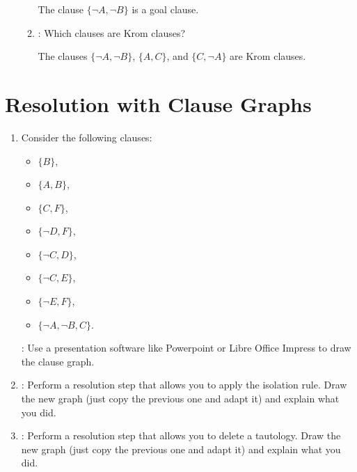 \documentclass[solution]{acAssignment}
\begin{document}
\begin{enumerate}
\begin{enumerate}
                \begin{acSolution}
                    The clause $\{\lnot A, \lnot B\}$ is a goal clause.
                \end{acSolution}
            
            \item {}: Which clauses are Krom clauses?
            
                \begin{acSolution}
                    The clauses $\{\lnot A, \lnot B\}$, $\{A, C\}$, and $\{C, \lnot A\}$ are Krom clauses.
                \end{acSolution}
        \end{enumerate}
\end{enumerate}

\section{Resolution with Clause Graphs}

\begin{enumerate}
    \item Consider the following clauses:
    
        \begin{itemize}
           \item $\{B\}$,
           \item $\{A, B\}$,
           \item $\{C, F\}$,
           \item $\{\lnot D, F\}$,
           \item $\{\lnot C, D\}$,
           \item $\{\lnot C, E\}$,
           \item $\{\lnot E, F\}$,
           \item $\{\lnot A, \lnot B, C\}$.
        \end{itemize}
        
        :
        Use a presentation software like Powerpoint or Libre Office Impress to draw the clause graph.
    
    \item {}:
        Perform a resolution step that allows you to apply the isolation rule.
        Draw the new graph (just copy the previous one and adapt it) and explain what you did.
    
    \item {}:
        Perform a resolution step that allows you to delete a tautology.
        Draw the new graph (just copy the previous one and adapt it) and explain what you did.
\end{enumerate}
\end{document}
